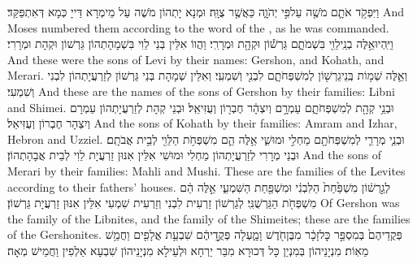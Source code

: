 {וַיִּפְקֹ֥ד אֹתָ֛ם מֹשֶׁ֖ה עַל\maqqaf פִּ֣י יְהֹוָ֑ה כַּאֲשֶׁ֖ר צֻוָּֽה׃}
{וּמְנָא יָתְהוֹן מֹשֶׁה עַל מֵימְרָא דַּייָ כְּמָא דְּאִתְפַּקַּד׃}
{And Moses numbered them according to the word of the \lord, as he was commanded.}{}
{וַיִּֽהְיוּ\maqqaf אֵ֥לֶּה בְנֵֽי\maqqaf לֵוִ֖י בִּשְׁמֹתָ֑ם גֵּרְשׁ֕וֹן וּקְהָ֖ת וּמְרָרִֽי׃}
{וַהֲווֹ אִלֵּין בְּנֵי לֵוִי בִּשְׁמָהָתְהוֹן גֵּרְשׁוֹן וּקְהָת וּמְרָרִי׃}
{And these were the sons of Levi by their names: Gershon, and Kohath, and Merari.}{}
{וְאֵ֛לֶּה שְׁמ֥וֹת בְּֽנֵי\maqqaf גֵרְשׁ֖וֹן לְמִשְׁפְּחֹתָ֑ם לִבְנִ֖י וְשִׁמְעִֽי׃}
{וְאִלֵּין שְׁמָהָת בְּנֵי גֵּרְשׁוֹן לְזַרְעֲיָתְהוֹן לִבְנִי וְשִׁמְעִי׃}
{And these are the names of the sons of Gershon by their families: Libni and Shimei.}{}
{וּבְנֵ֥י קְהָ֖ת לְמִשְׁפְּחֹתָ֑ם עַמְרָ֣ם וְיִצְהָ֔ר חֶבְר֖וֹן וְעֻזִּיאֵֽל׃}
{וּבְנֵי קְהָת לְזַרְעֲיָתְהוֹן עַמְרָם וְיִצְהָר חֶבְרוֹן וְעֻזִּיאֵל׃}
{And the sons of Kohath by their families: Amram and Izhar, Hebron and Uzziel.}{}
{וּבְנֵ֧י מְרָרִ֛י לְמִשְׁפְּחֹתָ֖ם מַחְלִ֣י וּמוּשִׁ֑י אֵ֥לֶּה הֵ֛ם מִשְׁפְּחֹ֥ת הַלֵּוִ֖י לְבֵ֥ית אֲבֹתָֽם׃}
{וּבְנֵי מְרָרִי לְזַרְעֲיָתְהוֹן מַחְלִי וּמוּשִׁי אִלֵּין אִנּוּן זַרְעֲיָת לֵוִי לְבֵית אֲבָהָתְהוֹן׃}
{And the sons of Merari by their families: Mahli and Mushi. These are the families of the Levites according to their fathers’ houses.}{}
{לְגֵ֣רְשׁ֔וֹן מִשְׁפַּ֙חַת֙ הַלִּבְנִ֔י וּמִשְׁפַּ֖חַת הַשִּׁמְעִ֑י אֵ֣לֶּה הֵ֔ם מִשְׁפְּחֹ֖ת הַגֵּרְשֻׁנִּֽי׃}
{לְגֵרְשׁוֹן זַרְעִית לִבְנִי וְזַרְעִית שִׁמְעִי אִלֵּין אִנּוּן זַרְעֲיָת גֵּרְשׁוֹן׃}
{Of Gershon was the family of the Libnites, and the family of the Shimeites; these are the families of the Gershonites.}{}
{פְּקֻדֵיהֶם֙ בְּמִסְפַּ֣ר כׇּל\maqqaf זָכָ֔ר מִבֶּן\maqqaf חֹ֖דֶשׁ וָמָ֑עְלָה פְּקֻ֣דֵיהֶ֔ם שִׁבְעַ֥ת אֲלָפִ֖ים וַחֲמֵ֥שׁ מֵאֽוֹת׃}
{מִנְיָנֵיהוֹן בְּמִנְיַן כָּל דְּכוּרָא מִבַּר יַרְחָא וּלְעֵילָא מִנְיָנֵיהוֹן שִׁבְעָא אַלְפִין וַחֲמֵישׁ מְאָה׃}
